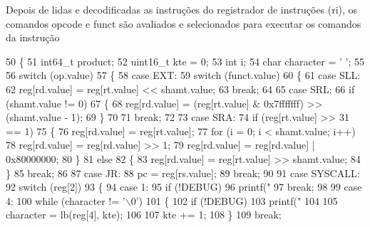 Depois de lidas e decodificadas as instruções do registrador de instruções (ri), os comandos opcode e funct são avaliados e selecionados para executar os comandos da instrução 
\begin{DoxyCode}
50 \{
51     int64\_t product;
52     uint16\_t kte = 0;
53     \textcolor{keywordtype}{int} i;
54     \textcolor{keywordtype}{char} character = \textcolor{charliteral}{' '};
55 
56     \textcolor{keywordflow}{switch} (op.value)
57     \{
58     \textcolor{keywordflow}{case} EXT:
59         \textcolor{keywordflow}{switch} (funct.value)
60         \{
61         \textcolor{keywordflow}{case} SLL:
62             reg[rd.value] = reg[rt.value] << shamt.value;
63             \textcolor{keywordflow}{break};
64 
65         \textcolor{keywordflow}{case} SRL:
66             \textcolor{keywordflow}{if} (shamt.value != 0)
67             \{
68                 reg[rd.value] = (reg[rt.value] & 0x7fffffff) >> (shamt.value - 1);
69             \}
70 
71             \textcolor{keywordflow}{break};
72 
73         \textcolor{keywordflow}{case} SRA:
74             \textcolor{keywordflow}{if} (reg[rt.value] >> 31 == 1)
75             \{
76                 reg[rd.value] = reg[rt.value];
77                 \textcolor{keywordflow}{for} (i = 0; i < shamt.value; i++)
78                     reg[rd.value] = reg[rd.value] >> 1;
79                 reg[rd.value] = reg[rd.value] | 0x80000000;
80             \}
81             \textcolor{keywordflow}{else}
82             \{
83                 reg[rd.value] = reg[rt.value] >> shamt.value;
84             \}
85             \textcolor{keywordflow}{break};
86 
87         \textcolor{keywordflow}{case} JR:
88             pc = reg[rs.value];
89             \textcolor{keywordflow}{break};
90 
91         \textcolor{keywordflow}{case} SYSCALL:
92             \textcolor{keywordflow}{switch} (reg[2])
93             \{
94             \textcolor{keywordflow}{case} 1:
95                 \textcolor{keywordflow}{if} (!DEBUG)
96                     printf(\textcolor{stringliteral}{"%
97                 \textcolor{keywordflow}{break};
98 
99             \textcolor{keywordflow}{case} 4:
100                 \textcolor{keywordflow}{while} (character != \textcolor{charliteral}{'\(\backslash\)0'})
101                 \{
102                     \textcolor{keywordflow}{if} (!DEBUG)
103                         printf(\textcolor{stringliteral}{"%
104 
105                     character = lb(reg[4], kte);
106 
107                     kte += 1;
108                 \}
109                 \textcolor{keywordflow}{break};
}}
\end{DoxyCode}
